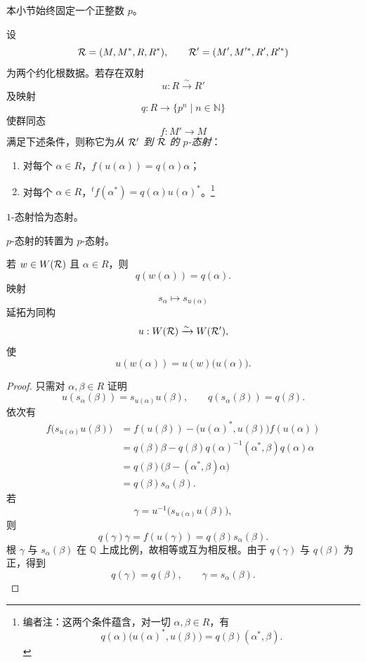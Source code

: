 本小节始终固定一个正整数 \(p\)。

\begin{definition}\label{sga3:XXI:6.8.1}
设
\[
 \mathcal{R}=(M,M^\ast,R,R^\ast),
 \qquad
 \mathcal{R}'=(M',M'^\ast,R',R'^\ast)
\]
为两个约化根数据。若存在双射
\[
 u:R\xrightarrow{\sim}R'
\]
及映射
\[
 q:R\longrightarrow\{p^n\mid n\in\mathbb N\}
\]
使群同态
\[
 f:M'\longrightarrow M
\]
满足下述条件，则称它为\emph{从 \(\mathcal{R}'\) 到 \(\mathcal{R}\) 的 \(p\)-态射}：
\begin{enumerate}
\item[(i)] 对每个 \(\alpha\in R\)，\(f(u(\alpha))=q(\alpha)\alpha\)；
\item[(ii)] 对每个 \(\alpha\in R\)，\({}^tf(\alpha^\ast)=q(\alpha)u(\alpha)^\ast\)。\footnote{编者注：这两个条件蕴含，对一切 \(\alpha,\beta\in R\)，有
  \[
   q(\alpha)\bigl(u(\alpha)^\ast,u(\beta)\bigr)
   =q(\beta)(\alpha^\ast,\beta).
  \]}
\end{enumerate}
\end{definition}

\begin{corollary}\label{sga3:XXI:6.8.2}
\(1\)-态射恰为态射。
\end{corollary}

\begin{corollary}\label{sga3:XXI:6.8.3}
\(p\)-态射的转置为 \(p\)-态射。
\end{corollary}

\begin{lemma}\label{sga3:XXI:6.8.4}
若 \(w\in W(\mathcal{R})\) 且 \(\alpha\in R\)，则
\[
 q(w(\alpha))=q(\alpha).
\]
映射
\[
 s_\alpha\longmapsto s_{u(\alpha)}
\]
延拓为同构
\[
 u:W(\mathcal{R})\xrightarrow{\sim}W(\mathcal{R}'),
\]
使
\[
 u(w(\alpha))=u(w)\bigl(u(\alpha)\bigr).
\]
\end{lemma}

\begin{proof}
只需对 \(\alpha,\beta\in R\) 证明
\[
 u(s_\alpha(\beta))=s_{u(\alpha)}u(\beta),
 \qquad
 q(s_\alpha(\beta))=q(\beta).
\]
依次有
\begin{align*}
 f\bigl(s_{u(\alpha)}u(\beta)\bigr)
  &=f(u(\beta))
    -\bigl(u(\alpha)^\ast,u(\beta)\bigr)f(u(\alpha))\\
  &=q(\beta)\beta
    -q(\beta)q(\alpha)^{-1}
       (\alpha^\ast,\beta)q(\alpha)\alpha\\
  &=q(\beta)\bigl(\beta-(\alpha^\ast,\beta)\alpha\bigr)\\
  &=q(\beta)s_\alpha(\beta).
\end{align*}
若
\[
 \gamma=u^{-1}\bigl(s_{u(\alpha)}u(\beta)\bigr),
\]
则
\[
 q(\gamma)\gamma=f(u(\gamma))=q(\beta)s_\alpha(\beta).
\]
根 \(\gamma\) 与 \(s_\alpha(\beta)\) 在 \(\mathbb Q\) 上成比例，故相等或互为相反根。由于 \(q(\gamma)\) 与 \(q(\beta)\) 为正，得到
\[
 q(\gamma)=q(\beta),
 \qquad
 \gamma=s_\alpha(\beta).
\]
\end{proof}

